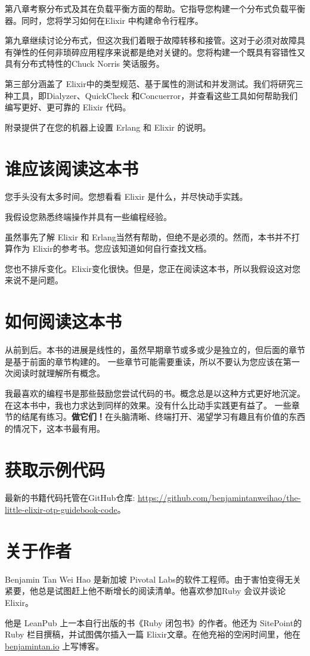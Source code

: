 第八章考察分布式及其在负载平衡方面的帮助。它指导您构建一个分布式负载平衡器。同时，您将学习如何在Elixir 中构建命令行程序。

第九章继续讨论分布式，但这次我们着眼于故障转移和接管。这对于必须对故障具有弹性的任何非琐碎应用程序来说都是绝对关键的。您将构建一个既具有容错性又具有分布式特性的Chuck Norris 笑话服务。

第三部分涵盖了 Elixir中的类型规范、基于属性的测试和并发测试。我们将研究三种工具，即Dialyzer、QuickCheck 和Concuerror，并查看这些工具如何帮助我们编写更好、更可靠的 Elixir 代码。

附录提供了在您的机器上设置 Erlang 和 Elixir 的说明。

\section*{谁应该阅读这本书}

您手头没有太多时间。您想看看 Elixir 是什么，并尽快动手实践。

我假设您熟悉终端操作并具有一些编程经验。

虽然事先了解 Elixir 和 Erlang当然有帮助，但绝不是必须的。然而，本书并不打算作为 Elixir的参考书。您应该知道如何自行查找文档。

您也不排斥变化。Elixir变化很快。但是，您正在阅读这本书，所以我假设这对您来说不是问题。

\section*{如何阅读这本书}

从前到后。本书的进展是线性的，虽然早期章节或多或少是独立的，但后面的章节是基于前面的章节构建的。
一些章节可能需要重读，所以不要认为您应该在第一次阅读时就理解所有概念。

我最喜欢的编程书是那些鼓励您尝试代码的书。概念总是以这种方式更好地沉淀。
在这本书中，我也力求达到同样的效果。没有什么比动手实践更有益了。
一些章节的结尾有练习。\textbf{做它们！}在头脑清晰、终端打开、渴望学习有趣且有价值的东西的情况下，这本书最有用。

\section*{获取示例代码}

最新的书籍代码托管在GitHub仓库: \url{https://github.com/benjamintanweihao/the-little-elixir-otp-guidebook-code}。

\section*{关于作者}

Benjamin Tan Wei Hao 是新加坡 Pivotal Labs的软件工程师。由于害怕变得无关紧要，他总是试图赶上他不断增长的阅读清单。他喜欢参加Ruby 会议并谈论 Elixir。

他是 LeanPub 上一本自行出版的书《Ruby 闭包书》的作者。他还为 SitePoint的 Ruby 栏目撰稿，并试图偶尔插入一篇 Elixir文章。在他充裕的空闲时间里，他在 \url{benjamintan.io} 上写博客。
